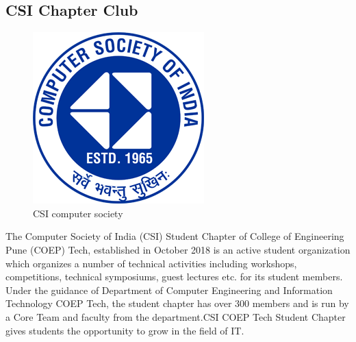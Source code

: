 \documentclass[12pt]{article}
\begin{document}
\subsection{CSI Chapter Club}
\begin{figure}[h]
    \centering
    \includegraphics[scale=0.5]{csi logo}
    \caption{CSI computer society}
    \label{fig4:csilogo}
\end{figure}
The Computer Society of India (CSI) Student Chapter of College of Engineering Pune (COEP) Tech, established in October 2018 is an active student organization which organizes a number of technical activities including workshops, competitions, technical symposiums, guest lectures etc. for its student members. Under the guidance of Department of Computer Engineering and Information Technology COEP Tech, the student chapter has over 300 members and is run by a Core Team and faculty from the department.CSI COEP Tech Student Chapter gives students the opportunity to grow in the field of IT.



\clearpage
\end{document}
